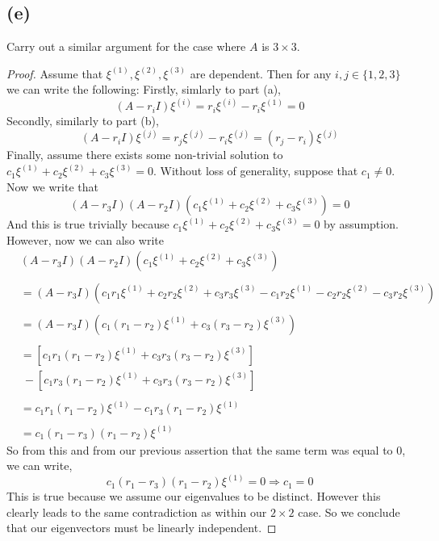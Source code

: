\documentclass{article}
\theoremstyle{definition}
\begin{document}
    \subsection*{(e)}
        \begin{mdframed}[]
            Carry out a similar argument for the case where $A$ is $3 \times 3$.
        \end{mdframed}
        \begin{proof}
            Assume that $\xi^{(1)}, \xi^{(2)}, \xi^{(3)}$ are dependent. Then for any $i,j \in \{1,2,3\}$ we can write the following:
            Firstly, simlarly to part (a),
            \[
                (A - r_iI)\xi^{(i)} = r_i \xi^{(i)} - r_i \xi^{(1)} = 0
            \]
            Secondly, similarly to part (b),
            \[
                (A - r_iI)\xi^{(j)} = r_j\xi^{(j)} - r_i\xi^{(j)}  = (r_j - r_i)\xi^{(j)}
            \]
            Finally, assume there exists some non-trivial solution to $c_1\xi^{(1)} + c_2\xi^{(2)} + c_3\xi^{(3)} = 0$.
            Without loss of generality, suppose that $c_1 \neq 0$. Now we write that 
            \[
                (A - r_3I)(A - r_2I)(c_1\xi^{(1)} + c_2\xi^{(2)} + c_3\xi^{(3)}) = 0
            \]
            And this is true trivially because $c_1\xi^{(1)} + c_2\xi^{(2)} + c_3\xi^{(3)} = 0$ by assumption. However,
            now we can also write 
            \begin{align*}
                &(A - r_3I)(A - r_2I)(c_1\xi^{(1)} + c_2\xi^{(2)} + c_3\xi^{(3)}) \\\\
                &= (A - r_3I)(c_1 r_1 \xi^{(1)} + c_2r_2\xi^{(2)} + c_3r_3\xi^{(3)} - c_1r_2\xi^{(1)} - c_2r_2\xi^{(2)} - c_3r_2\xi^{(3)}) \\\\
                &=(A - r_3I)(c_1(r_1 - r_2)\xi^{(1)} + c_3(r_3 - r_2)\xi^{(3)}) \\\\
                &=[c_1 r_1 (r_1 - r_2)\xi^{(1)} + c_3r_3(r_3 - r_2)\xi^{(3)}]\\
                & \ -[c_1 r_3 (r_1 - r_2)\xi^{(1)} + c_3 r_3 (r_3 - r_2)\xi^{(3)}] \\\\
                &=c_1 r_1 (r_1 - r_2)\xi^{(1)} - c_1 r_3 (r_1 - r_2)\xi^{(1)} \\\\
                &=c_1(r_1 - r_3)(r_1 - r_2)\xi^{(1)}
            \end{align*}
            So from this and from our previous assertion that the same term was equal to 0, we can write,
            \[
                c_1(r_1 - r_3)(r_1 - r_2)\xi^{(1)} = 0 \Longrightarrow c_1 = 0
            \]
            This is true because we assume our eigenvalues to be distinct. However this clearly leads to the same contradiction
            as within our $2 \times 2$ case. So we conclude that our eigenvectors must be linearly independent.
        \end{proof}
\end{document}
